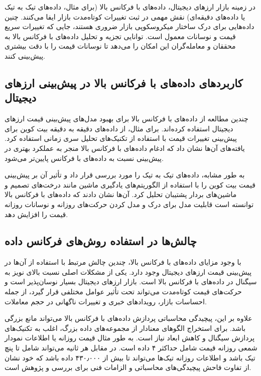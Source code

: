 در زمینه بازار ارزهای دیجیتال، داده‌های با فرکانس بالا (برای مثال، داده‌های تیک به تیک یا داده‌های دقیقه‌ای) نقش مهمی در ثبت تغییرات کوتاه‌مدت بازار ایفا می‌کنند. چنین داده‌هایی برای درک ساختار میکروسکوپی بازار ضروری هستند، جایی که تغییرات سریع قیمت و نوسانات معمول است. توانایی تجزیه و تحلیل داده‌های با فرکانس بالا به محققان و معامله‌گران این امکان را می‌دهد تا نوسانات قیمت را با دقت بیشتری پیش‌بینی کنند.

\subsection{کاربردهای داده‌های با فرکانس بالا در پیش‌بینی ارزهای دیجیتال}
چندین مطالعه از داده‌های با فرکانس بالا برای بهبود مدل‌های پیش‌بینی قیمت ارزهای دیجیتال استفاده کرده‌اند. برای مثال، \cite{author1} از داده‌های دقیقه به دقیقه بیت کوین برای پیش‌بینی تغییرات قیمت با استفاده از تکنیک‌های تحلیل سری زمانی استفاده کرد. یافته‌های آن‌ها نشان داد که ادغام داده‌های با فرکانس بالا منجر به عملکرد بهتری در پیش‌بینی نسبت به داده‌های با فرکانس پایین‌تر می‌شود.

به طور مشابه، \cite{author2} داده‌های تیک به تیک را مورد بررسی قرار داد و تأثیر آن بر پیش‌بینی قیمت بیت کوین را با استفاده از الگوریتم‌های یادگیری ماشین مانند درخت‌های تصمیم و ماشین‌های بردار پشتیبان تحلیل کرد. آن‌ها نشان دادند که داده‌های با فرکانس بالا توانسته است قابلیت مدل برای درک و مدل کردن حرکت‌های روزانه و نوسانات روزانه قیمت را افزایش دهد.

\subsection{چالش‌ها در استفاده روش‌های فرکانس داده}
با وجود مزایای داده‌های با فرکانس بالا، چندین چالش مرتبط با استفاده از آن‌ها در پیش‌بینی قیمت ارزهای دیجیتال وجود دارد. یکی از مشکلات اصلی نسبت بالای نویز به سیگنال در داده‌های با فرکانس بالا است. بازار ارزهای دیجیتال بسیار نوسان‌پذیر است و حرکت‌های قیمت کوتاه‌مدت می‌تواند تحت تأثیر عوامل مختلفی قرار گیرد، از جمله احساسات بازار، رویدادهای خبری و تغییرات ناگهانی در حجم معاملات.

علاوه بر این، پیچیدگی محاسباتی پردازش داده‌های با فرکانس بالا می‌تواند مانع بزرگی باشد. برای استخراج الگوهای معنادار از مجموعه‌های داده بزرگ، اغلب به تکنیک‌های پردازش سیگنال و کاهش ابعاد نیاز است. به طور مثال قیمت روزانه یا اطلاعات نمودار شمعی روزانه قیمت شامل حداکثر ۴ داده است. در مقابل هر ثانیه می‌تواند شامل تا پنچ تیک باشد و اطلاعات روزانه تیک‌ها می‌تواند تا بیش از ۴۳۰٫۰۰۰ داده باشد که خود نشان از تفاوت فاحش پیچیدگی‌های محاسباتی و الزامات فنی برای بررسی و پژوهش است.


